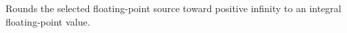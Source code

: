 Rounds the selected floating-point source toward positive infinity to an integral floating-point value.
